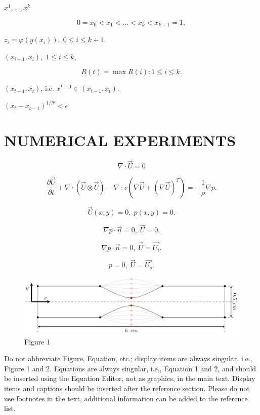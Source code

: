 \documentclass{aip-cp}
\begin{document}
$x^1,...,x^k$

\begin{equation}\label{x_i}
0=x_0<x_1<\dots <x_k<x_{k+1}=1,
\end{equation}

$z_i=\varphi(y(x_i)), \; 0 \leq i\leq k+1,$ 

$(x_{i-1},x_i), \; 1\leq i \leq k, $


\[
R(t)=\max{R(i):1 \leq i \leq k}.
\]

$(x_{t-1},x_t)$, i.e. $x^{k+1} \in (x_{t-1},x_t)$.

  $\left(x_t-x_{t-1}\right)^{1/N}<\epsilon$
	

\section{NUMERICAL EXPERIMENTS}

\[
\nabla \cdot \vec{U} = 0
\]

\[
\frac{\partial \vec{U}}{\partial t} + \nabla \cdot \left( \vec{U} \otimes \vec{U}\right) - \nabla \cdot v \left( \nabla \vec{U} + (\nabla \vec{U})^T\right) = - \frac{1}{\rho} \nabla p.
\]

\[
\vec{U}(x,y) = 0, \; p(x,y) = 0.
\]

\[
\nabla p \cdot \vec{n} = 0, \; \vec{U} = 0.
\]

\[
\nabla p \cdot \vec{n} = 0, \; \vec{U} = \vec{U_i}.
\]

\[
 p = 0, \; \vec{U} = \vec{U_o}.
\]


\begin{figure}%
\includegraphics[width=1.0\linewidth]{fig1.png}
\caption{Figure 1}
\label{fig}
\end{figure}



Do not abbreviate Figure, Equation, etc.; display items are always singular, i.e., Figure 1 and 2. Equations are always singular, i.e., Equation 1 and 2, and should be inserted using the Equation Editor, not as graphics, in the main text.  Display items and captions should be inserted after the reference section. Please do not use footnotes in the text, additional information can be added to the reference list.
\end{document}
